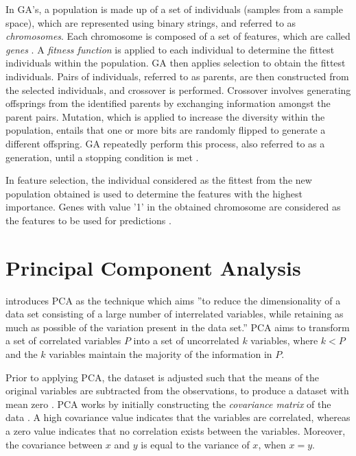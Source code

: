 In GA's, a population is made up of a set of individuals (samples from a sample space), which are represented using binary strings, and referred to as \textit{chromosomes}. Each chromosome is composed of a set of features, which are called \textit{genes} \citep{Siedlecki1989}. A \textit{fitness function} is applied to each individual to determine the fittest individuals within the population. GA then applies selection to obtain the fittest individuals. Pairs of individuals, referred to as parents, are then constructed from the selected individuals, and crossover is performed. Crossover involves generating offsprings from the identified parents by exchanging information amongst the parent pairs. Mutation, which is applied to increase the diversity within the population, entails that one or more bits are randomly flipped to generate a different offspring. GA repeatedly perform this process, also referred to as a generation, until a stopping condition is met \citep{Chaikla}. 

In feature selection, the individual considered as the fittest from the new population obtained is used to determine the features with the highest importance. Genes with value '1' in the obtained chromosome are considered as the features to be used for predictions \citep{sivanandam2007introduction}.


\section{Principal Component Analysis}

\citet{jolliffe2002principal} introduces PCA as the technique which aims ''to reduce the dimensionality of a data set consisting of a large number of interrelated variables, while retaining as much as possible of the variation present in the data set.'' PCA aims to transform a set of correlated variables $P$ into a set of uncorrelated $k$ variables, where $k < P$ and the $k$ variables maintain the majority of the information in $P$. 

Prior to applying PCA, the dataset is adjusted such that the means of the original variables are subtracted from the observations, to produce a dataset with mean zero \citep{jackson2005user}. PCA works by initially constructing the \textit{covariance matrix} of the data \citep{Guan2009}. A high covariance value indicates that the variables are correlated, whereas a zero value indicates that no correlation exists between the variables. Moreover, the covariance between $x$ and $y$ is equal to the variance of $x$, when $x = y$. 

